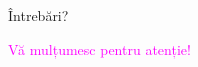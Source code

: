 \begin{frame}[plain]
\begin{center}
\vspace{2cm}
{\Huge \textcolor{mainblue}{Întrebări?}}

\vspace{1.5cm}
{\Large \textcolor{magenta}{Vă mulțumesc pentru atenție!}}


\end{center}


\bcolorbar
\end{frame}